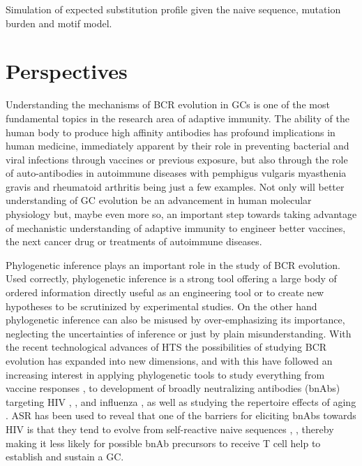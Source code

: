 Simulation of expected substitution profile given the naive sequence, mutation burden and motif model.








\fi


\chapter{Perspectives}
Understanding the mechanisms of BCR evolution in GCs is one of the most fundamental topics in the research area of adaptive immunity.
The ability of the human body to produce high affinity antibodies has profound implications in human medicine, immediately apparent by their role in preventing bacterial and viral infections through vaccines or previous exposure, but also through the role of auto-antibodies in autoimmune diseases with pemphigus vulgaris \cite{payne2005genetic} myasthenia gravis \cite{lindstrom1998antibody} and rheumatoid arthritis \cite{steiner2002autoantibodies} being just a few examples.
Not only will better understanding of GC evolution be an advancement in human molecular physiology but, maybe even more so, an important step towards taking advantage of mechanistic understanding of adaptive immunity to engineer better vaccines, the next cancer drug or treatments of autoimmune diseases.

Phylogenetic inference plays an important role in the study of BCR evolution.
Used correctly, phylogenetic inference is a strong tool offering a large body of ordered information directly useful as an engineering tool or to create new hypotheses to be scrutinized by experimental studies.
On the other hand phylogenetic inference can also be misused by over-emphasizing its importance, neglecting the uncertainties of inference or just by plain misunderstanding.
With the recent technological advances of HTS the possibilities of studying BCR evolution has expanded into new dimensions, and with this have followed an increasing interest in applying phylogenetic tools to study everything from vaccine responses \cite{raymond2016influenza}, to development of broadly neutralizing antibodies (bnAbs) targeting HIV \cite{Doria-Rose2014-vi}, \cite{Wu2011-yj}, \cite{Zhu_undated-zz} and influenza \cite{pappas2014rapid}, \cite{xu2015key} as well as studying the repertoire effects of aging \cite{de2017phylogenetic}.
ASR has been used to reveal that one of the barriers for eliciting bnAbs towards HIV is that they tend to evolve from self-reactive naive sequences \cite{williams2017potent}, \cite{liao2011initial}, thereby making it less likely for possible bnAb precursors to receive T cell help to establish and sustain a GC.

